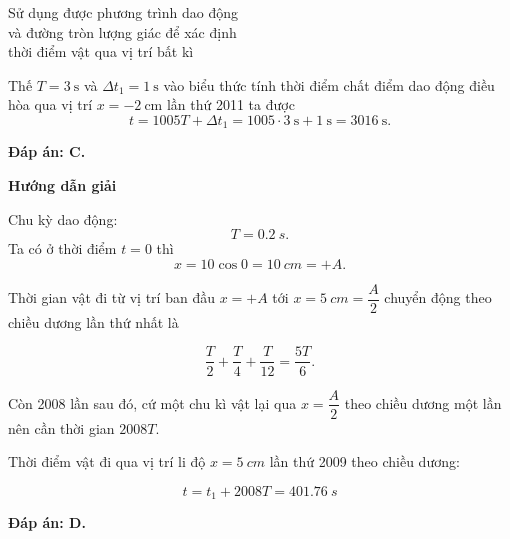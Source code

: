 \begin{dang}{Sử dụng được phương trình dao động\\ và đường tròn lượng giác để xác định\\ thời điểm vật qua vị trí bất kì}
{		Thế $T=\SI{3}{\second}$ và $\Delta t_1=\SI{1}{\second}$ vào biểu thức tính thời điểm chất điểm dao động điều hòa qua vị trí $x=\SI{-2}{\centi\meter}$ lần thứ 2011 ta được
		\begin{equation*}
			t=1005T+\Delta t_1=1005\cdot\SI{3}{\second} +\SI{1}{\second}=\SI{3016}{\second}.
		\end{equation*}
		
		\textbf{Đáp án: C.}
	}
	{\begin{center}
			\textbf{Hướng dẫn giải}
		\end{center}
		
		Chu kỳ dao động:
		\begin{equation*}
			T =\SI{0,2}{s}.
		\end{equation*}
		Ta có ở thời điểm $t=0$ thì
		\begin{equation*}
			x= 10 \cos 0 =\SI{10}{cm}= + A.
		\end{equation*}
		
		Thời gian vật đi từ vị trí ban đầu $x=+A$ tới $x =\SI{5}{cm} =\dfrac{A}{2}$ chuyển động theo chiều dương lần thứ nhất là
		
		\begin{equation*}
			\dfrac{T}{2} + \dfrac{T}{4} + \dfrac{T}{12} = \dfrac{5T}{6}.
		\end{equation*}
		
		Còn 2008 lần sau đó, cứ một chu kì vật lại qua $x=\dfrac{A}{2}$ theo chiều dương một lần nên cần thời gian $2008T$.
		
		Thời điểm vật đi qua vị trí li độ $x=\SI{5}{cm}$ lần thứ 2009 theo chiều dương:
		
		\begin{equation*}
			t =t_1+ 2008T = \SI{401,76}{s}
		\end{equation*}
		
		\textbf{Đáp án: D.}
	}
	
\end{dang}
